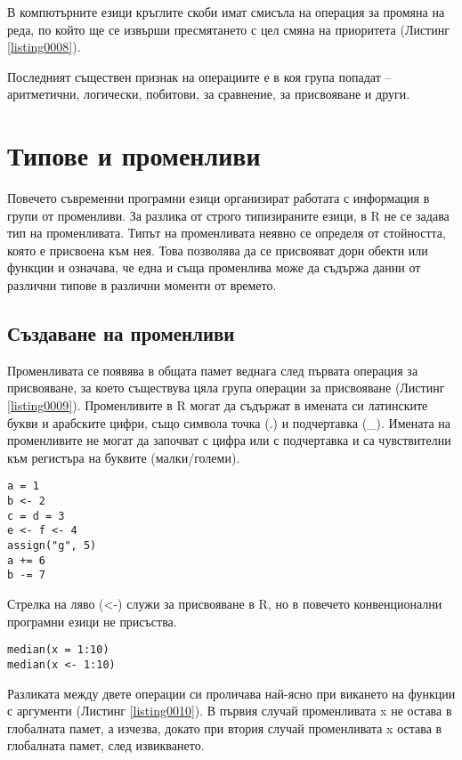 В компютърните езици кръглите скоби имат смисъла на операция за промяна на реда, по който ще се извърши пресмятането с цел смяна на приоритета (Листинг \ref{listing0008}).

Последният съществен признак на операциите е в коя група попадат – аритметични, логически, побитови, за сравнение, за присвояване и други.

\section{Типове и променливи}

Повечето съвременни програмни езици организират работата с информация в групи от променливи. За разлика от строго типизираните езици, в R не се задава тип на променливата. Типът на променливата неявно се определя от стойността, която е присвоена към нея. Това позволява да се присвояват дори обекти или функции и означава, че една и съща променлива може да съдържа данни от различни типове в различни моменти от времето.

\subsection{Създаване на променливи}

Променливата се появява в общата памет веднага след първата операция за присвояване, за което съществува цяла група операции за присвояване (Листинг \ref{listing0009}). Променливите в R могат да съдържат в имената си латинските букви и арабските цифри, също символа точка (.) и подчертавка (\_). Имената на променливите не могат да започват с цифра или с подчертавка и са чувствителни към регистъра на буквите (малки/големи).

\begin{lstlisting}[caption=Операции за присвояване, label=listing0009]
a = 1
b <- 2
c = d = 3
e <- f <- 4
assign("g", 5)
a += 6
b -= 7
\end{lstlisting}

Стрелка на ляво (<-) служи за присвояване в R, но в повечето конвенционални програмни езици не присъства. 

\begin{lstlisting}[caption=Алтернативи за операцията присвояване, label=listing0010]
median(x = 1:10)
median(x <- 1:10)
\end{lstlisting}

Разликата между двете операции си проличава най-ясно при викането на функции с аргументи (Листинг \ref{listing0010}). В първия случай променливата x не остава в глобалната памет, а изчезва, докато при втория случай променливата x остава в глобалната памет, след извикването. 

